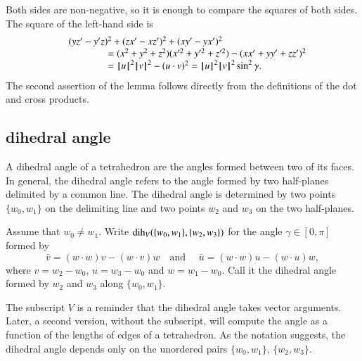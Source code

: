\begin{proved}
   Both sides are non-negative, so it is enough to compare the
   squares of both sides.  The square of the left-hand side is
   $$
   \begin{array}{lll}
   &(y z'- y'z)^2 + (z x' - x z')^2 + (x y' - y x')^2 \\
    &\qquad\qquad=
   (x^2 + y^2 + z^2)(x'^2 + y'^2 + z'^2) - (x x' + y y' + z z')^2
   \\&\qquad\qquad= {{\hskip0.1em|\hskip-0.15em|\hskip0.1em}u{\hskip0.1em|\hskip-0.15em|\hskip0.1em}}^2{{\hskip0.1em|\hskip-0.15em|\hskip0.1em}v{\hskip0.1em|\hskip-0.15em|\hskip0.1em}}^2 - (u\cdot v)^2 = {{\hskip0.1em|\hskip-0.15em|\hskip0.1em}u{\hskip0.1em|\hskip-0.15em|\hskip0.1em}}^2{{\hskip0.1em|\hskip-0.15em|\hskip0.1em}v{\hskip0.1em|\hskip-0.15em|\hskip0.1em}}^2 \sin^2\gamma.
   \end{array}
   $$
The second assertion of the lemma follows directly from the definitions of the dot and cross products.
\swallowed\end{proved}
%
%
%
%


\subsection{dihedral angle}

A dihedral angle of a tetrahedron are the angles formed between two of its faces. In general,
the dihedral angle refers to the angle formed by two half-planes
delimited by a common line.  The dihedral angle is determined
by two points $\{w_0,w_1\}$ on the delimiting line
and two points $w_2$ and $w_3$ on the two half-planes.

\begin{definition}\label{def:dih} Assume that $w_0\ne w_1$.
Write $\operatorname{dih}_V(\{w_0,w_1\},\{w_2,w_3\})$ for the angle $\gamma\in[0,\pi]$
formed
by 
    $$
    \bar v = (w\cdot w) v - (w\cdot v) w\quad\text{and }\quad \bar u =
            (w\cdot w) u - (w\cdot u) w,
    $$
where $v = w_2-w_0$, $u=w_3-w_0$ and $w=w_1-w_0$.  Call it
the dihedral angle formed by $w_2$ and $w_3$ along $\{w_0,w_1\}$.
\end{definition}
The subscript $V$ is a reminder 
that the dihedral angle takes vector arguments.
Later, a second version, without the subscript, will
compute the angle as a function of the lengths of edges of a 
tetrahedron.
As the notation suggests, the dihedral angle depends only
on the unordered pairs $\{w_0,w_1\}$, $\{w_2,w_3\}$.

